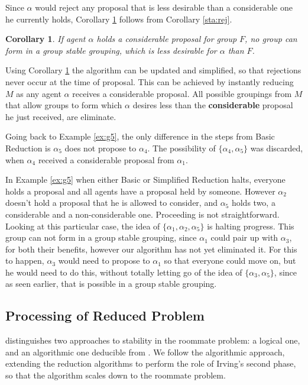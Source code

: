 \documentclass{elsarticle}
\newtheorem{mysta}{Corollary}
\begin{document}
Since $\alpha$ would reject any proposal that is less desirable than a considerable one he currently holds, Corollary \ref{sta:hold} follows from Corollary \ref{sta:rej}.

\begin{mysta}
\label{sta:hold}
If agent $\alpha$ holds a considerable proposal for group $F$, no group can form in a group stable grouping, which is less desirable for $\alpha$ than $F$.
\end{mysta}

Using Corollary \ref{sta:hold} the algorithm can be updated and simplified, so that rejections never occur at the time of proposal. This can be achieved by instantly reducing $M$ as any agent $\alpha$ receives a considerable proposal. All possible groupings from $M$ that allow groups to form which $\alpha$ desires less than the \textbf{considerable} proposal he just received, are eliminate.

\AlgSimplifiedReduction

Going back to Example \ref{ex:g5}, the only difference in the steps from Basic Reduction is $\alpha_5$ does not propose to $\alpha_4$. The possibility of $\{ \alpha_4, \alpha_5 \}$ was discarded, when $\alpha_4$ received a considerable proposal from $\alpha_1$.

In Example \ref{ex:g5} when either Basic or Simplified Reduction halts, everyone holds a proposal and all agents have a proposal held by someone. However $\alpha_2$ doesn't hold a proposal that he is allowed to consider, and $\alpha_5$ holds two, a considerable and a non-considerable one. Proceeding is not straightforward. Looking at this particular case, the idea of $\{ \alpha_1 , \alpha_2 , \alpha_5 \}$ is halting progress. This group can not form in a group stable grouping, since $\alpha_1$ could pair up with $\alpha_3$, for both their benefits, however our algorithm has not yet eliminated it. For this to happen, $\alpha_3$ would need to propose to $\alpha_1$ so that everyone could move on, but he would need to do this, without totally letting go of the idea of $\{ \alpha_3, \alpha_5 \}$, since as seen earlier, that is possible in a group stable grouping.

\subsection{Processing of Reduced Problem}

\cite{tan91} distinguishes two approaches to stability in the roommate problem: a logical one, and an algorithmic one deducible from \cite{irving85}. We follow the algorithmic approach, extending the reduction algorithms to perform the role of Irving's second phase, so that the algorithm scales down to the roommate problem.
\end{document}
